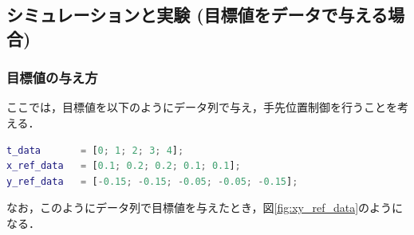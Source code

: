 \subsection{シミュレーションと実験 (目標値をデータで与える場合)}
\subsubsection{目標値の与え方}
ここでは，目標値を以下のようにデータ列で与え，手先位置制御を行うことを考える．

\begin{lstlisting}[language=Matlab]
t_data       = [0; 1; 2; 3; 4];
x_ref_data   = [0.1; 0.2; 0.2; 0.1; 0.1];
y_ref_data   = [-0.15; -0.15; -0.05; -0.05; -0.15];
\end{lstlisting}

なお，このようにデータ列で目標値を与えたとき，図\ref{fig:xy_ref_data}のようになる．

